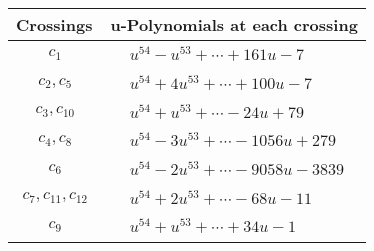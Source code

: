 \documentclass[1p]{elsarticle_modified}
\theoremstyle{definition}
\begin{document}
\begin{tabular}{m{50pt}|m{274pt}}
Crossings & \hspace{64pt}u-Polynomials at each crossing \\
\hline $$\begin{aligned}c_{1}\end{aligned}$$&$\begin{aligned}
&u^{54}- u^{53}+\cdots+161 u-7
\end{aligned}$\\
\hline $$\begin{aligned}c_{2},c_{5}\end{aligned}$$&$\begin{aligned}
&u^{54}+4 u^{53}+\cdots+100 u-7
\end{aligned}$\\
\hline $$\begin{aligned}c_{3},c_{10}\end{aligned}$$&$\begin{aligned}
&u^{54}+u^{53}+\cdots-24 u+79
\end{aligned}$\\
\hline $$\begin{aligned}c_{4},c_{8}\end{aligned}$$&$\begin{aligned}
&u^{54}-3 u^{53}+\cdots-1056 u+279
\end{aligned}$\\
\hline $$\begin{aligned}c_{6}\end{aligned}$$&$\begin{aligned}
&u^{54}-2 u^{53}+\cdots-9058 u-3839
\end{aligned}$\\
\hline $$\begin{aligned}c_{7},c_{11},c_{12}\end{aligned}$$&$\begin{aligned}
&u^{54}+2 u^{53}+\cdots-68 u-11
\end{aligned}$\\
\hline $$\begin{aligned}c_{9}\end{aligned}$$&$\begin{aligned}
&u^{54}+u^{53}+\cdots+34 u-1
\end{aligned}$\\
\hline
\end{tabular}\\~\\
\newpage\renewcommand{\arraystretch}{1}
\end{document}

